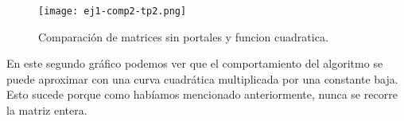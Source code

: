 \begin{figure}[h!]
\texttt{[image: ej1-comp2-tp2.png]}
\centering
\caption{Comparaci\'on de matrices sin portales y funcion cuadratica.}
\label{overflow3}
\end{figure}

En este segundo gr\'afico podemos ver que el comportamiento del algoritmo se puede aproximar con una curva cuadr\'atica multiplicada por una constante baja. Esto sucede porque como hab\'iamos mencionado anteriormente, nunca se recorre la matriz entera.

\pagebreak
